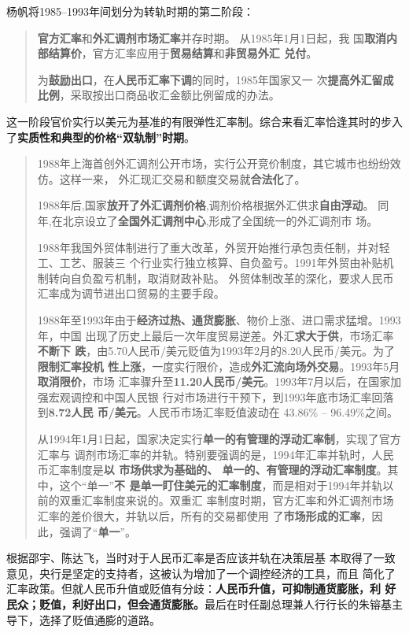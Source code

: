 杨帆将1985--1993年间划分为转轨时期的第二阶段：
\begin{quotation}
  \textbf{官方汇率}和\textbf{外汇调剂市场汇率}并存时期。 从1985年1月1日起，我
  国\textbf{取消内部结算价}，官方汇率应用于\textbf{贸易结算}和\textbf{非贸易外汇
    兑付}。

  为\textbf{鼓励出口}，在\textbf{人民币汇率下调}的同时，1985年国家又一
  次\textbf{提高外汇留成比例}，采取按出口商品收汇金额比例留成的办法。
\end{quotation}
这一阶段官价实行以美元为基准的有限弹性汇率制。综合来看汇率恰逢其时的步入
了\textbf{实质性和典型的价格“双轨制”时期}。

\begin{quotation}
1988年上海首创外汇调剂公开市场，实行公开竞价制度，其它城市也纷纷效仿。这样一来，
外汇现汇交易和额度交易就\textbf{合法化}了。\cite[769-770]{fengyunshi1b}

1988年后,国家\textbf{放开了外汇调剂价格},调剂价格根据外汇供求\textbf{自由浮动}。
同年,在北京设立了\textbf{全国外汇调剂中心},形成了全国统一的外汇调剂市
场。\cite{wangqiangshehui}

1988年我国外贸体制进行了重大改革，外贸开始推行承包责任制，并对轻工、工艺、服装三
个行业实行独立核算、自负盈亏。1991年外贸由补贴机制转向自负盈亏机制，取消财政补贴。
外贸体制改革的深化，要求人民币汇率成为调节进出口贸易的主要手段。

1988年至1993年由于\textbf{经济过热、通货膨胀}、物价上涨、进口需求猛增。1993年，中国
出现了历史上最后一次年度贸易逆差。外汇\textbf{求大于供}，市场汇率\textbf{不断下
  跌}，由5.70人民币/美元贬值为1993年2月的8.20人民币/美元。为了\textbf{限制汇率投机
  性上涨}，一度实行限价，造成\textbf{外汇流向场外交易}。1993年5月\textbf{取消限价}，市场
汇率骤升至\textbf{11.20人民币/美元}。1993年7月以后，在国家加强宏观调控和中国人民银
行对市场进行干预下，到1993年底市场汇率回落到\textbf{8.72人民
  币/美元}。\cite{huilvshi}人民币市场汇率贬值波动在 43.86\% -- 96.49\%之间。


从1994年1月1日起，国家决定实行\textbf{单一的有管理的浮动汇率制}，实现了官方汇率与
调剂市场汇率的并轨。特别要强调的是，1994年汇率并轨时，人民币汇率制度是\textbf{以
  市场供求为基础的、 单一的、有管理的浮动汇率制度}。其中，这个“单一”\textbf{不
  是单一盯住美元的汇率制度}，而是相对于1994年并轨以前的双重汇率制度来说的。双重汇
率制度时期，官方汇率和外汇调剂市场汇率的差价很大，并轨以后，所有的交易都使用
了\textbf{市场形成的汇率}，因此，强调了“\textbf{单一}”。\cite{guantaohuigai}
\end{quotation}

根据邵宇、陈达飞\cite{huilv70binggui}，当时对于人民币汇率是否应该并轨在决策层基
本取得了一致意见，央行是坚定的支持者，这被认为增加了一个调控经济的工具，而且
简化了汇率政策。但就人民币升值或贬值有分歧：\textbf{人民币升值，可抑制通货膨胀，利
  好民众；贬值，利好出口，但会通货膨胀。}最后在时任副总理兼人行行长的朱镕基主
导下，选择了贬值通膨的道路。

